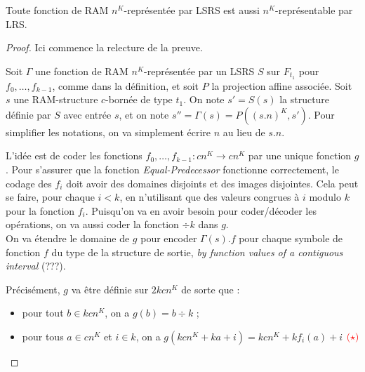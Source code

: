 		
		
		\begin{conj}
			\label{conj:rep_LSRS_rep_LRS}
			Toute fonction de RAM $n^K$-représentée par LSRS est aussi $n^K$-représentable par LRS.
		\end{conj}
		
		\begin{proof}
			Ici commence la relecture de la preuve.
			
			Soit $\Gamma$ une fonction de RAM $n^K$-représentée par un LSRS $S$ sur $F_{t_1}$ pour $f_0, \dots, f_{k-1}$, comme dans la définition, et soit $P$ la projection affine associée. Soit $s$ une RAM-structure $c$-bornée de type $t_1$. On note $s' = S(s)$ la structure définie par $S$ avec entrée $s$, et on note $s'' = \Gamma(s) = P\left( (s.n)^K, s'\right)$. Pour simplifier les notations, on va simplement écrire $n$ au lieu de $s.n$.
			
			L'idée est de coder les fonctions $f_0, \dots, f_{k-1} : cn^K \to cn^K$ par une unique fonction $g$. Pour s'assurer que la fonction \emph{Equal-Predecessor} fonctionne correctement, le codage des $f_i$ doit avoir des domaines disjoints et des images disjointes. Cela peut se faire, pour chaque $i<k$, en n'utilisant que des valeurs congrues à $i$ modulo $k$ pour la fonction $f_i$. Puisqu'on va en avoir besoin pour coder/décoder les opérations, on va aussi coder la fonction $\div k$ dans $g$.\\
			
			On va étendre le domaine de $g$ pour encoder $\Gamma(s).f$ pour chaque symbole de fonction $f$ du type de la structure de sortie, \emph{by function values of a contiguous interval} (???).
			
			Précisément, $g$ va être définie sur $2kcn^K$ de sorte que :
			
			\begin{itemize}[itemsep=-1mm]
				\item	pour tout $b \in kcn^K$, on a $g(b) = b \div k$ ;
				\item 	pour tous $a \in cn^K$ et $i \in k$, on a $g\left( kcn^K + ka + i \right) = kcn^K + k f_i(a) + i$ $\textcolor{red}{(\star)}$
			\end{itemize}
			
			\espace
			
\end{proof}
